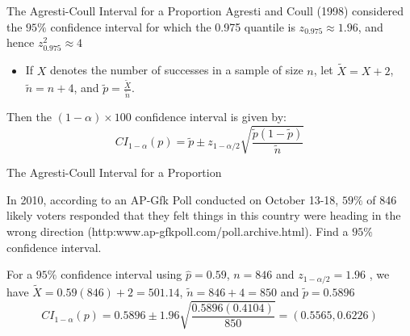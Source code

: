 \documentclass[
  ignorenonframetext,
]{beamer}
\providecommand{\tightlist}{%
  \setlength{\itemsep}{0pt}\setlength{\parskip}{0pt}}
\begin{document}
\begin{frame}{The Agresti-Coull Interval for a Proportion}
\label{the-agresti-coull-interval-for-a-proportion}
Agresti and Coull (1998) considered the \(95\%\) confidence interval for
which the 0.975 quantile is \(z_{0.975}\approx1.96\), and hence
\(z^2_{0.975}\approx 4\)

\begin{itemize}
\tightlist
\item
  If \(X\) denotes the number of successes in a sample of size \(n\),
  let \(\tilde{X}=X+2\), \(\tilde{n}=n+4\), and
  \(\tilde{p}=\frac{\tilde{X}}{\tilde{n}}\).
\end{itemize}

Then the \((1-\alpha)\times 100\) confidence interval is given by:
\[CI_{1 - \alpha}(p) = \tilde{p}\pm z_{1-\alpha/2}\sqrt{\frac{\tilde{p}(1-\tilde{p})}{\tilde{n}}}\]
\end{frame}

\begin{frame}{The Agresti-Coull Interval for a Proportion}
\label{the-agresti-coull-interval-for-a-proportion-1}
\begin{tcolorbox}
In 2010, according to an AP-Gfk Poll conducted on October 13-18, $59\%$ of 846 likely voters responded that they felt things in this country were heading in the wrong direction (http:www.ap-gfkpoll.com/poll.archive.html). Find a $95\%$ confidence interval. 
\end{tcolorbox}

\begin{tcolorbox}
For a $95\%$ confidence interval using $\hat{p}=0.59$, $n=846$ and $z_{1-\alpha/2}=1.96$ , we have $\tilde{X}=0.59(846)+2=501.14$, $\tilde{n}=846+4=850$ and $\tilde{p}=0.5896$
$$CI_{1 - \alpha}(p)=0.5896\pm 1.96\sqrt{\frac{0.5896(0.4104)}{850}}=(0.5565,0.6226)$$
\end{tcolorbox}
\end{frame}
\end{document}
